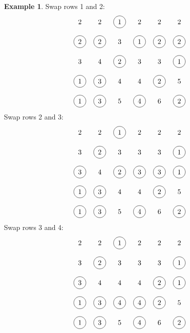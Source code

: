 \documentclass[submission]{FPSAC2018}
\newcommand{\0}{\phantom{c}}
\theoremstyle{plain}
\theoremstyle{definition}
\newtheorem{example}[thm]{Example}
\numberwithin{equation}{section}
\begin{document}
\begin{example}
\noindent Swap rows 1 and 2:
\[
\begin{tikzpicture}\node at (0, 5){2};\node at (1, 5){2};\node[circle, draw=black] at (2, 5){1};\node at (3, 5){2};\node at (4, 5){2};\node at (5, 5){2};\node[circle, draw=black] at (0, 4){2};\node[circle, draw=black] at (1, 4){2};\node at (2, 4){3};\node[circle, draw=black] at (3, 4){1};\node[circle, draw=black] at (4, 4){2};\node[circle, draw=black] at (5, 4){2};\node at (0, 3){3};\node at (1, 3){4};\node[circle, draw=black] at (2, 3){2};\node at (3, 3){3};\node at (4, 3){3};\node[circle, draw=black] at (5, 3){1};\node[circle, draw=black] at (0, 2){1};\node[circle, draw=black] at (1, 2){3};\node at (2, 2){4};\node at (3, 2){4};\node[circle, draw=black] at (4, 2){2};\node at (5, 2){5};\node[circle, draw=black] at (0, 1){1};\node[circle, draw=black] at (1, 1){3};\node at (2, 1){5};\node[circle, draw=black] at (3, 1){4};\node at (4, 1){6};\node[circle, draw=black] at (5, 1){2};\end{tikzpicture}
\]
Swap rows 2 and 3:
\[
\begin{tikzpicture}\node at (0, 5){2};\node at (1, 5){2};\node[circle, draw=black] at (2, 5){1};\node at (3, 5){2};\node at (4, 5){2};\node at (5, 5){2};\node at (0, 4){3};\node[circle, draw=black] at (1, 4){2};\node at (2, 4){3};\node at (3, 4){3};\node at (4, 4){3};\node[circle, draw=black] at (5, 4){1};\node[circle, draw=black] at (0, 3){3};\node at (1, 3){4};\node[circle, draw=black] at (2, 3){2};\node[circle, draw=black] at (3, 3){3};\node[circle, draw=black] at (4, 3){3};\node[circle, draw=black] at (5, 3){1};\node[circle, draw=black] at (0, 2){1};\node[circle, draw=black] at (1, 2){3};\node at (2, 2){4};\node at (3, 2){4};\node[circle, draw=black] at (4, 2){2};\node at (5, 2){5};\node[circle, draw=black] at (0, 1){1};\node[circle, draw=black] at (1, 1){3};\node at (2, 1){5};\node[circle, draw=black] at (3, 1){4};\node at (4, 1){6};\node[circle, draw=black] at (5, 1){2};\end{tikzpicture}
\]
Swap rows 3 and 4:
\[
\begin{tikzpicture}\node at (0, 5){2};\node at (1, 5){2};\node[circle, draw=black] at (2, 5){1};\node at (3, 5){2};\node at (4, 5){2};\node at (5, 5){2};\node at (0, 4){3};\node[circle, draw=black] at (1, 4){2};\node at (2, 4){3};\node at (3, 4){3};\node at (4, 4){3};\node[circle, draw=black] at (5, 4){1};\node[circle, draw=black] at (0, 3){3};\node at (1, 3){4};\node at (2, 3){4};\node at (3, 3){4};\node[circle, draw=black] at (4, 3){2};\node[circle, draw=black] at (5, 3){1};\node[circle, draw=black] at (0, 2){1};\node[circle, draw=black] at (1, 2){3};\node[circle, draw=black] at (2, 2){4};\node[circle, draw=black] at (3, 2){4};\node[circle, draw=black] at (4, 2){2};\node at (5, 2){5};\node[circle, draw=black] at (0, 1){1};\node[circle, draw=black] at (1, 1){3};\node at (2, 1){5};\node[circle, draw=black] at (3, 1){4};\node at (4, 1){6};\node[circle, draw=black] at (5, 1){2};\end{tikzpicture}
\]
\end{example}
\end{document}
